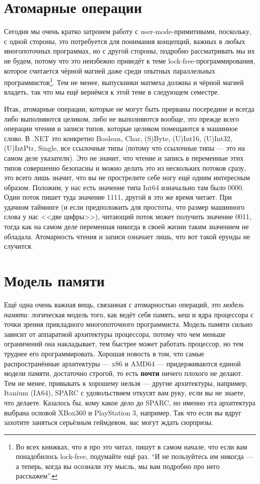 \documentclass[a5paper]{article}
\begin{document}
\section{Атомарные операции}

Сегодня мы очень кратко затронем работу с user-mode-примитивами, поскольку, с одной стороны, это потребуется для понимания концепций, важных в любых многопоточных программах, но с другой стороны, подробно рассматривать мы их не будем, потому что это неизбежно приведёт к теме lock-free-программирования, которое считается чёрной магией даже среди опытных параллельных программистов\footnote{Во всех книжках, что я про это читал, пишут в самом начале, что если вам понадобилось lock-free, подумайте ещё раз. ``И не пользуйтесь им никогда --- а теперь, когда вы осознали эту мысль, мы вам подробно про него расскажем''.}. Тем не менее, выпускники матмеха должны и чёрной магией владеть, так что мы ещё вернёмся к этой теме в следующем семестре.

Итак, атомарные операции, которые не могут быть прерваны посередине и всегда либо выполняются целиком, либо не выполняются вообще, это прежде всего операции чтения и записи типов, которые целиком помещаются в машинное слово. В .NET это конкретно Boolean, Char, (S)Byte, (U)Int16, (U)Int32, (U)IntPtr, Single, все ссылочные типы (потому что ссылочные типы --- это на самом деле указатели). Это не значит, что чтение и запись в переменные этих типов совершенно безопасны и можно делать это из нескольких потоков сразу, это всего лишь значит, что вы не прострелите себе ногу ещё одним интересным образом. Положим, у нас есть значение типа Int64 изначально там было 0000. Один поток пишет туда значение 1111, другой в это же время читает. При удачном тайминге (и если предположить для простоты, что размер машинного слова у нас <<две цифры>>), читающий поток может получить значение 0011, тогда как на самом деле переменная никогда в своей жизни таким значением не обладала. Атомарность чтения и записи означает лишь, что вот такой ерунды не случится.

\section{Модель памяти}

Ещё одна очень важная вещь, связанная с атомарностью операций, это \textit{модель памяти}: логическая модель того, как ведёт себя память, кеш и ядра процессора с точки зрения прикладного многопоточного программиста. Модель памяти сильно зависит от аппаратной архитектуры процессора, потому что чем меньше ограничений она накладывает, тем быстрее может работать процессор, но тем труднее его программировать. Хорошая новость в том, что самые распространённые архитектуры --- x86 и AMD64 --- придерживаются единой модели памяти, достаточно строгой, то есть \textbf{почти} ничего плохого не делают. Тем не менее, привыкать к хорошему нельзя --- другие архитектуры, например, Itanium (IA64), SPARC с удовольствием откусят вам руку, если вы не знаете, что делаете. Казалось бы, кому какое дело до SPARC, но именно эта архитектура выбрана основой XBox360 и PlayStation 3, например. Так что если вы вдруг захотите заняться серьёзным геймдевом, вас могут ждать сюрпризы.
\end{document}
